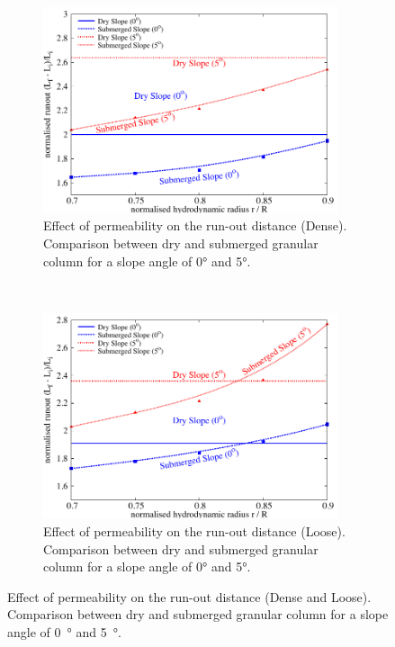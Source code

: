 \begin{figure}
	\centering
\begin{subfigure}[b]{0.95\textwidth}
	\centering
    \includegraphics[width=0.95\textwidth]{Perm_Runout_a08_dense}
    \caption{Effect of permeability on the run-out distance (Dense). Comparison 
    between dry and submerged granular column for a slope angle of 
    0\si{\degree} and 5\si{\degree}.}
    \label{fig:Perm_Runout_a08_dense}
\end{subfigure}\\
\begin{subfigure}[b]{0.95\textwidth}
	\centering
    \includegraphics[width=0.95\textwidth]{Perm_Runout_a08_loose}
    \caption{Effect of permeability on the run-out distance (Loose). Comparison 
        between dry and submerged granular column for a slope angle of 
        0\si{\degree} and 5\si{\degree}.}
    \label{fig:Perm_Runout_a08_loose}
\end{subfigure}
\caption{Effect of permeability on the run-out distance (Dense and Loose). 
	Comparison between dry and submerged granular column for a slope angle of 
    0~\si{\degree} and 5~\si{\degree}.}
\label{fig:Perm_Runout_loose_dense}
\end{figure}

